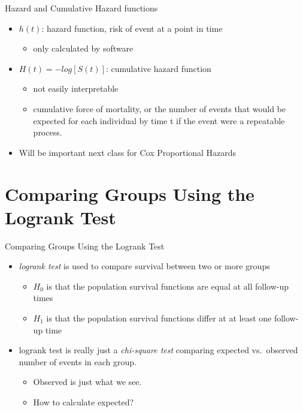 \documentclass[
  ignorenonframetext,
]{beamer}
\providecommand{\tightlist}{%
  \setlength{\itemsep}{0pt}\setlength{\parskip}{0pt}}
\begin{document}
\begin{frame}{Hazard and Cumulative Hazard functions}
\protect\hypertarget{hazard-and-cumulative-hazard-functions}{}

\begin{itemize}
\tightlist
\item
  \(h(t)\): hazard function, risk of event at a point in time

  \begin{itemize}
  \tightlist
  \item
    only calculated by software
  \end{itemize}
\item
  \(H(t) = -log[S(t)]\): cumulative hazard function

  \begin{itemize}
  \tightlist
  \item
    not easily interpretable
  \item
    cumulative force of mortality, or the number of events that would be
    expected for each individual by time t if the event were a
    repeatable process.
  \end{itemize}
\item
  Will be important next class for Cox Proportional Hazards
\end{itemize}

\end{frame}

\hypertarget{comparing-groups-using-the-logrank-test}{%
\section{Comparing Groups Using the Logrank
Test}\label{comparing-groups-using-the-logrank-test}}

\begin{frame}{Comparing Groups Using the Logrank Test}

\begin{itemize}
\tightlist
\item
  \emph{logrank test} is used to compare survival between two or more
  groups

  \begin{itemize}
  \tightlist
  \item
    \(H_0\) is that the population survival functions are equal at all
    follow-up times
  \item
    \(H_1\) is that the population survival functions differ at at least
    one follow-up time
  \end{itemize}
\item
  logrank test is really just a \emph{chi-square test} comparing
  expected vs.~observed number of events in each group.

  \begin{itemize}
  \tightlist
  \item
    Observed is just what we see.
  \item
    How to calculate expected?
  \end{itemize}
\end{itemize}

\end{frame}
\end{document}
